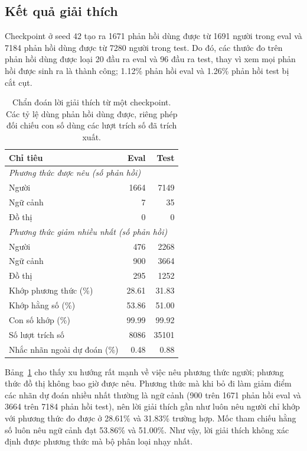 \documentclass[conference]{IEEEtran}
\newcommand{\tablegap}{\setlength{\tabcolsep}{4pt}}
\begin{document}
\subsection{Kết quả giải thích}\label{sec:explanations}
Checkpoint ở seed 42 tạo ra 1671 phản hồi dùng được từ 1691 người trong eval và 7184 phản hồi dùng được từ 7280 người trong test. Do đó, các thước đo trên phản hồi dùng được loại 20 đầu ra eval và 96 đầu ra test, thay vì xem mọi phản hồi được sinh ra là thành công; 1.12\% phản hồi eval và 1.26\% phản hồi test bị cắt cụt.

\begin{table}[t]
\centering
\caption{Chẩn đoán lời giải thích từ một checkpoint. Các tỷ lệ dùng phản hồi dùng được, riêng phép đối chiếu con số dùng các lượt trích số đã trích xuất.}
\label{tab:explanations}
\small
\tablegap
\begin{tabular}{lrr}
\toprule
Chỉ tiêu & Eval & Test \\
\midrule
\multicolumn{3}{l}{\emph{Phương thức được nêu (số phản hồi)}} \\
\quad Người & 1664 & 7149 \\
\quad Ngữ cảnh & 7 & 35 \\
\quad Đồ thị & 0 & 0 \\
\multicolumn{3}{l}{\emph{Phương thức giảm nhiều nhất (số phản hồi)}} \\
\quad Người & 476 & 2268 \\
\quad Ngữ cảnh & 900 & 3664 \\
\quad Đồ thị & 295 & 1252 \\
\midrule
Khớp phương thức (\%) & 28.61 & 31.83 \\
Khớp hằng số (\%) & 53.86 & 51.00 \\
Con số khớp (\%) & 99.99 & 99.92 \\
Số lượt trích số & 8086 & 35101 \\
Nhắc nhãn ngoài dự đoán (\%) & 0.48 & 0.88 \\
\bottomrule
\end{tabular}
\end{table}

Bảng~\ref{tab:explanations} cho thấy xu hướng rất mạnh về việc nêu phương thức người; phương thức đồ thị không bao giờ được nêu. Phương thức mà khi bỏ đi làm giảm điểm các nhãn dự đoán nhiều nhất thường là ngữ cảnh (900 trên 1671 phản hồi eval và 3664 trên 7184 phản hồi test), nên lời giải thích gần như luôn nêu người chỉ khớp với phương thức đo được ở 28.61\% và 31.83\% trường hợp. Mốc tham chiếu hằng số luôn nêu ngữ cảnh đạt 53.86\% và 51.00\%. Như vậy, lời giải thích không xác định được phương thức mà bộ phân loại nhạy nhất.
\end{document}

